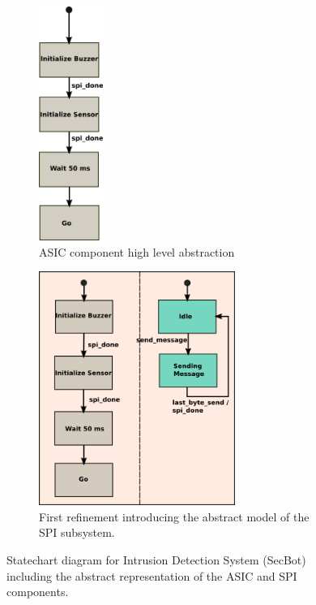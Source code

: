 \begin{figure}[t!]
	    \begin{subfigure}[t]{0.3\textwidth}
	        \begin{centering}
	        \includegraphics[height=3in]{figures/ASIC}
	        \caption{ASIC component high level abstraction}
	        \label{fig:ASIC}
	        \end{centering}
	    \end{subfigure}
\qquad
	    \begin{subfigure}[t]{0.5\textwidth}
	        \includegraphics[height=3in]{figures/ASIC&SPI_1}
	        \caption{First refinement introducing the abstract model of the SPI subsystem.}
	        \label{fig:ASIC_SPI_1}
	    \end{subfigure}
	    \caption{Statechart diagram for Intrusion Detection System (SecBot) including the abstract representation of the ASIC and SPI components.}
\end{figure}

